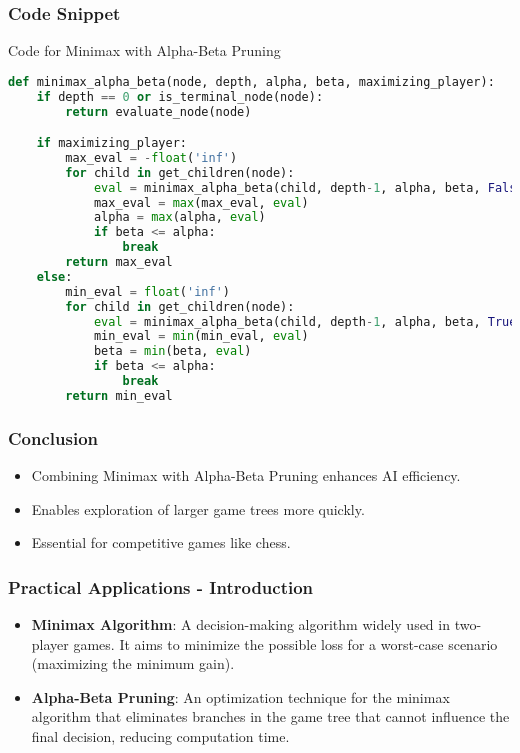 \documentclass[aspectratio=169]{beamer}
\begin{document}
\begin{frame}[fragile]
    \frametitle{Code Snippet}
    \begin{block}{Code for Minimax with Alpha-Beta Pruning}
        \begin{lstlisting}[language=Python]
def minimax_alpha_beta(node, depth, alpha, beta, maximizing_player):
    if depth == 0 or is_terminal_node(node):
        return evaluate_node(node)

    if maximizing_player:
        max_eval = -float('inf')
        for child in get_children(node):
            eval = minimax_alpha_beta(child, depth-1, alpha, beta, False)
            max_eval = max(max_eval, eval)
            alpha = max(alpha, eval)
            if beta <= alpha:
                break
        return max_eval
    else:
        min_eval = float('inf')
        for child in get_children(node):
            eval = minimax_alpha_beta(child, depth-1, alpha, beta, True)
            min_eval = min(min_eval, eval)
            beta = min(beta, eval)
            if beta <= alpha:
                break
        return min_eval
        \end{lstlisting}
    \end{block}
\end{frame}

\begin{frame}
    \frametitle{Conclusion}
    \begin{itemize}
        \item Combining Minimax with Alpha-Beta Pruning enhances AI efficiency.
        \item Enables exploration of larger game trees more quickly.
        \item Essential for competitive games like chess.
    \end{itemize}
\end{frame}

\begin{frame}[fragile]
    \frametitle{Practical Applications - Introduction}
    \begin{itemize}
        \item \textbf{Minimax Algorithm}: A decision-making algorithm widely used in two-player games. It aims to minimize the possible loss for a worst-case scenario (maximizing the minimum gain).
        \item \textbf{Alpha-Beta Pruning}: An optimization technique for the minimax algorithm that eliminates branches in the game tree that cannot influence the final decision, reducing computation time.
    \end{itemize}
\end{frame}
\end{document}
